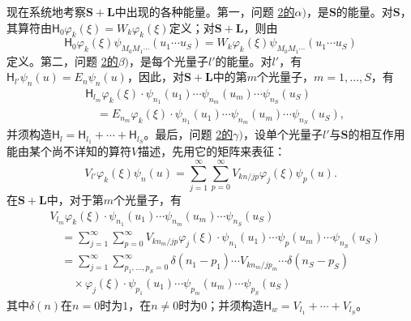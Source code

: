 \documentclass[fontsize=13pt,twoside,openany,headings=normal,parskip=false,bookmarkpackage=false,DIV=calc]{scrbook}
\begin{document}
现在系统地考察$\boldsymbol{S}+\boldsymbol{L}$中出现的各种能量。第一，问题 \hyperref[problem:III.6.2alpha]{2的$\alpha)$}，是$\boldsymbol{S}$的能量。对$\boldsymbol{S}$，其算符由$\mathsf{H}_0\varphi_k(\xi)=W_k\varphi_k(\xi)$定义；对$\boldsymbol{S}+\boldsymbol{L}$，则由
\[
 \mathsf{H}_0\varphi_k(\xi)\psi_{M_0M_1\cdots}(u_1\cdots u_S)
 =W_k\varphi_k(\xi)\psi_{M_0M_1\cdots}(u_1\cdots u_S)
\]
定义。第二，问题 \hyperref[problem:III.6.2beta]{2的$\beta)$}，是每个光量子$l'$的能量。对$l'$，有$\mathsf{H}_{l'}\psi_n(u)=E_n\psi_n(u)$，\hypertarget{origpage-148}{}\label{origpage-148}因此，对$\boldsymbol{S}+\boldsymbol{L}$中的第$m$个光量子，$m=1,\allowbreak \ldots,\allowbreak S$，有
\begin{align*}
 &\mathsf{H}_{l_m}\varphi_k(\xi)\cdot\psi_{n_1}(u_1)\cdots\psi_{n_m}(u_m)\cdots\psi_{n_S}(u_S)\\
 &\quad=E_{n_m}\varphi_k(\xi)\cdot\psi_{n_1}(u_1)\cdots\psi_{n_m}(u_m)\cdots\psi_{n_S}(u_S),
\end{align*}
并须构造$\mathsf{H}_l=\mathsf{H}_{l_1}+\cdots+\mathsf{H}_{l_S}$。最后，问题 \hyperref[problem:III.6.2gamma]{2的$\gamma)$}，设单个光量子$l'$与$\boldsymbol{S}$的相互作用能由某个尚不详知的算符$V$描述，先用它的矩阵来表征：
\[
 V_{l'}\varphi_k(\xi)\psi_n(u)=\sum_{j=1}^{\infty}\sum_{p=0}^{\infty}V_{kn/jp}\varphi_j(\xi)\psi_p(u).
\]
在$\boldsymbol{S}+\boldsymbol{L}$中，对于第$m$个光量子，有
\begin{align*}
 &V_{l_m}\varphi_k(\xi)\cdot\psi_{n_1}(u_1)\cdots\psi_{n_m}(u_m)\cdots\psi_{n_S}(u_S)\\
 &\quad=\sum_{j=1}^{\infty}\sum_{p=0}^{\infty}V_{kn_m/jp}\varphi_j(\xi)\cdot
 \psi_{n_1}(u_1)\cdots\psi_p(u_m)\cdots\psi_{n_S}(u_S)\\
 &\quad=\sum_{j=1}^{\infty}\sum_{p_1,\ldots,p_S=0}^{\infty}
 \delta(n_1-p_1)\cdots V_{kn_m/jp_m}\cdots\delta(n_S-p_S)\\
 &\qquad{}\times\varphi_j(\xi)\cdot\psi_{p_1}(u_1)\cdots\psi_{p_m}(u_m)\cdots\psi_{p_S}(u_S)
\end{align*}
其中$\delta(n)$在$n=0$时为$1$，在$n\ne0$时为$0$；并须构造$\mathsf{H}_w=V_{l_1}+\cdots+V_{l_S}$。
\end{document}
